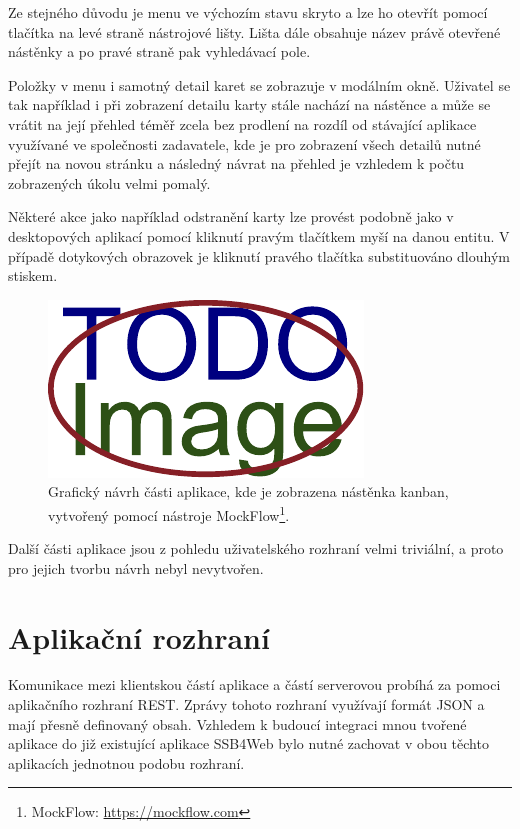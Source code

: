 Ze stejného důvodu je menu ve výchozím stavu skryto a lze ho otevřít pomocí tlačítka na levé straně nástrojové lišty. Lišta dále obsahuje název právě otevřené nástěnky a po pravé straně pak vyhledávací pole.

Položky v menu i samotný detail karet se zobrazuje v modálním okně. Uživatel se tak například i při zobrazení detailu karty stále nachází na nástěnce a může se vrátit na její přehled téměř zcela bez prodlení na rozdíl od stávající aplikace využívané ve společnosti zadavatele, kde je pro zobrazení všech detailů nutné přejít na novou stránku a následný návrat na přehled je vzhledem k počtu zobrazených úkolu velmi pomalý.

Některé akce jako například odstranění karty lze provést podobně jako v desktopových aplikací pomocí kliknutí pravým tlačítkem myší na danou entitu. V případě dotykových obrazovek je kliknutí pravého tlačítka substituováno dlouhým stiskem. 

\begin{figure}[H]
	\centering
	\label{img:design-kanban}
	\includegraphics[width=\textwidth]{obrazky-figures/placeholder.pdf}
	\caption{Grafický návrh části aplikace, kde je zobrazena nástěnka kanban, vytvořený pomocí nástroje MockFlow\footnote{MockFlow: \url{https://mockflow.com}}.}
\end{figure}

Další části aplikace jsou z pohledu uživatelského rozhraní velmi triviální, a proto pro jejich tvorbu návrh nebyl nevytvořen.


\section{Aplikační rozhraní}\label{sec:api}
Komunikace mezi klientskou částí aplikace a částí serverovou probíhá za pomoci aplikačního rozhraní REST. Zprávy tohoto rozhraní využívají formát JSON a mají přesně definovaný obsah.
Vzhledem k budoucí integraci mnou tvořené aplikace do již existující aplikace SSB4Web bylo nutné zachovat v obou těchto aplikacích jednotnou podobu rozhraní.

